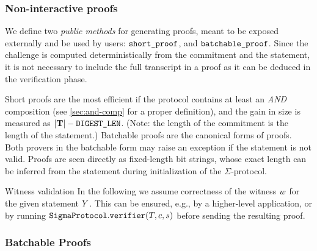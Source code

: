 \documentclass[11pt]{article}
\begin{document}



\subsubsection{Non-interactive proofs}

We define two \emph{public methods} for generating proofs, meant to be exposed externally and be used by users: $\texttt{short\_proof}$, and $\texttt{batchable\_proof}$.
Since the challenge is computed deterministically from the commitment and the statement, it is not necessary to include the full transcript in a proof as it can be deduced in the verification phase.

Short proofs are the most efficient if the protocol contains at least an \emph{AND} composition (see \cref{sec:and-comp} for a proper definition), and the gain in size is measured as $|\mathbf {T}| - \texttt{DIGEST\_LEN}$.
(Note: the length of the commitment is the length of the statement.)
Batchable proofs are the canonical forms of proofs.
Both provers in the batchable form may raise an exception if the statement is not valid.
Proofs are seen directly as fixed-length bit strings, whose exact length can be inferred from the statement during initialization of the $\Sigma$-protocol.

\begin{remark}{Witness validation}{}
  In the following we assume correctness of the witness $w$ for the given statement $Y$.
	This can be ensured, e.g., by a higher-level application, or by running $\texttt{SigmaProtocol}.\texttt{verifier}(T, c, s)$ before sending the resulting proof.
\end{remark}

\subsubsection{Batchable Proofs}
\end{document}
